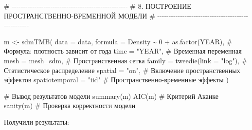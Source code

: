 \documentclass[
  letterpaper,
  DIV=11,
  numbers=noendperiod]{scrreprt}
\newenvironment{Shaded}{\begin{snugshade}}{\end{snugshade}}
\newcommand{\AttributeTok}[1]{\textcolor[rgb]{0.40,0.45,0.13}{#1}}
\newcommand{\CommentTok}[1]{\textcolor[rgb]{0.37,0.37,0.37}{#1}}
\newcommand{\DecValTok}[1]{\textcolor[rgb]{0.68,0.00,0.00}{#1}}
\newcommand{\FunctionTok}[1]{\textcolor[rgb]{0.28,0.35,0.67}{#1}}
\newcommand{\NormalTok}[1]{\textcolor[rgb]{0.00,0.23,0.31}{#1}}
\newcommand{\OtherTok}[1]{\textcolor[rgb]{0.00,0.23,0.31}{#1}}
\newcommand{\SpecialCharTok}[1]{\textcolor[rgb]{0.37,0.37,0.37}{#1}}
\newcommand{\StringTok}[1]{\textcolor[rgb]{0.13,0.47,0.30}{#1}}
\begin{document}
\begin{Shaded}
\begin{Highlighting}[]
\CommentTok{\# {-}{-}{-}{-}{-}{-}{-}{-}{-}{-}{-}{-}{-}{-}{-}{-}{-}{-}{-}{-}{-}{-}{-}{-}{-}{-}{-}{-}{-}{-}{-}{-}{-}{-}{-}{-}{-}{-}{-}{-}{-}{-}{-}{-}{-}{-}{-}{-}{-}{-}{-}}
\CommentTok{\# 8. ПОСТРОЕНИЕ ПРОСТРАНСТВЕННО{-}ВРЕМЕННОЙ МОДЕЛИ}
\CommentTok{\# {-}{-}{-}{-}{-}{-}{-}{-}{-}{-}{-}{-}{-}{-}{-}{-}{-}{-}{-}{-}{-}{-}{-}{-}{-}{-}{-}{-}{-}{-}{-}{-}{-}{-}{-}{-}{-}{-}{-}{-}{-}{-}{-}{-}{-}{-}{-}{-}{-}{-}{-}}

\NormalTok{m }\OtherTok{\textless{}{-}} \FunctionTok{sdmTMB}\NormalTok{(}
  \AttributeTok{data =}\NormalTok{ data, }
  \AttributeTok{formula =}\NormalTok{ Density }\SpecialCharTok{\textasciitilde{}} \DecValTok{0} \SpecialCharTok{+} \FunctionTok{as.factor}\NormalTok{(YEAR),  }\CommentTok{\# Формула: плотность зависит от года}
  \AttributeTok{time =} \StringTok{"YEAR"}\NormalTok{,         }\CommentTok{\# Временная переменная}
  \AttributeTok{mesh =}\NormalTok{ mesh\_sdm,       }\CommentTok{\# Пространственная сетка}
  \AttributeTok{family =} \FunctionTok{tweedie}\NormalTok{(}\AttributeTok{link =} \StringTok{"log"}\NormalTok{),  }\CommentTok{\# Статистическое распределение}
  \AttributeTok{spatial =} \StringTok{"on"}\NormalTok{,        }\CommentTok{\# Включение пространственных эффектов}
  \AttributeTok{spatiotemporal =} \StringTok{"iid"} \CommentTok{\# Пространственно{-}временные эффекты}
\NormalTok{)}

\CommentTok{\# Вывод результатов модели}
\FunctionTok{summary}\NormalTok{(m)}
\FunctionTok{AIC}\NormalTok{(m)  }\CommentTok{\# Критерий Акаике}
\FunctionTok{sanity}\NormalTok{(m)  }\CommentTok{\# Проверка корректности модели}
\end{Highlighting}
\end{Shaded}

Получили результаты:
\end{document}
